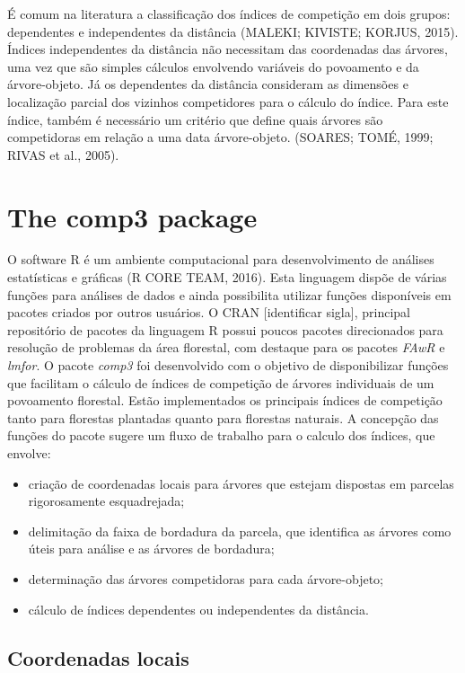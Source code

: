 \documentclass[article]{jss}
\begin{document}
É comum na literatura a classificação dos índices de competição em dois
grupos: dependentes e independentes da distância (MALEKI; KIVISTE;
KORJUS, 2015). Índices independentes da distância não necessitam das
coordenadas das árvores, uma vez que são simples cálculos envolvendo
variáveis do povoamento e da árvore-objeto. Já os dependentes da
distância consideram as dimensões e localização parcial dos vizinhos
competidores para o cálculo do índice. Para este índice, também é
necessário um critério que define quais árvores são competidoras em
relação a uma data árvore-objeto. (SOARES; TOMÉ, 1999; RIVAS et al.,
2005).

\section{The comp3 package}\label{the-comp3-package}

O software R é um ambiente computacional para desenvolvimento de
análises estatísticas e gráficas (R CORE TEAM, 2016). Esta linguagem
dispõe de várias funções para análises de dados e ainda possibilita
utilizar funções disponíveis em pacotes criados por outros usuários. O
CRAN {[}identificar sigla{]}, principal repositório de pacotes da
linguagem R possui poucos pacotes direcionados para resolução de
problemas da área florestal, com destaque para os pacotes \emph{FAwR} e
\emph{lmfor}. O pacote \emph{comp3} foi desenvolvido com o objetivo de
disponibilizar funções que facilitam o cálculo de índices de competição
de árvores individuais de um povoamento florestal. Estão implementados
os principais índices de competição tanto para florestas plantadas
quanto para florestas naturais. A concepção das funções do pacote sugere
um fluxo de trabalho para o calculo dos índices, que envolve:

\begin{itemize}
\item
  criação de coordenadas locais para árvores que estejam dispostas em
  parcelas rigorosamente esquadrejada;
\item
  delimitação da faixa de bordadura da parcela, que identifica as
  árvores como úteis para análise e as árvores de bordadura;
\item
  determinação das árvores competidoras para cada árvore-objeto;
\item
  cálculo de índices dependentes ou independentes da distância.
\end{itemize}

\subsection{Coordenadas locais}\label{coordenadas-locais}
\end{document}

